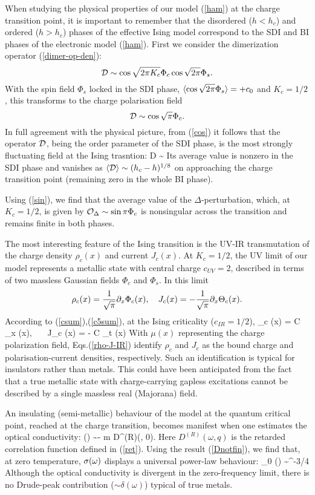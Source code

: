 When studying the physical properties of our model (\ref{ham}) at the charge
transition point, it is important to remember that the disordered ($h < h_c$)
and ordered ($h > h_c$) phases of the effective Ising model
correspond to the SDI and BI phases of the electronic model (\ref{ham}).
First we consider the dimerization operator (\ref{dimer-op-den}):
$$
{\cal D} \sim \cos \sqrt{2\pi K_c} \Phi_c \cos \sqrt{2\pi} \Phi_s.
$$
With the spin field $\Phi_s$ locked in the SDI phase,
$\langle \cos \sqrt{2\pi} \Phi_s \rangle = +c_0$ and $K_c =1/2$, this transforms to
the charge polarisation field
$$
{\cal D} \sim \cos \sqrt{\pi} \Phi_c.
$$
In full agreement with the physical picture, from (\ref{cos}) it follows that
the operator ${\cal D}$, being the 
order parameter of the SDI phase, is the most strongly fluctuating field
at the Ising trasntion:
\be
{\cal D} \sim \mu \label{D-mu}
\ee
Its average value is nonzero in the SDI phase and vanishes
as $\langle {\cal D} \rangle \sim (h_c - h)^{1/8}$ on approaching the charge transition
point (remaining zero in the whole BI phase).

Using (\ref{sin}), we find that
the average value of the $\Delta$-perturbation, which, at $K_c = 1/2$, is
given by
$
{\cal O}_{\Delta} \sim \sin {\pi} \Phi_c 
$
is nonsingular across the transition and remains finite in both
phases.

The most interesting feature of the Ising transition 
is the UV-IR transmutation of the charge density $\rho_c (x)$
and current $J_c (x)$. At $K_c = 1/2$, the UV limit of our model 
represents a metallic state with central charge $c_{UV} = 2$,
described in terms of two massless Gaussian fields $\Phi_c$ and $\Phi_s$.
In this limit
$$
\rho_c (x) = \frac{1}{\sqrt{\pi}} \partial_x \Phi_c (x), ~~~
J_c (x) = - \frac{1}{\sqrt{\pi}} \partial_x \Theta_c (x).
$$
According to (\ref{csum}),(\ref{c5sum}), at the Ising criticality
($c_{IR} = 1/2$),
\be
\rho_c (x) = C \p_x \mu (x), ~~~J_c (x) = - C \p_t \mu (x) 
\label{rho-J-IR}
\ee
With $\mu (x)$ representing the charge polarization field,
Eqs.(\ref{rho-J-IR}) identify $\rho_c$ and $J_c$ as the bound charge
and polarisation-current densities, 
respectively. Such an identification is typical
for insulators rather than metals. 
This could have been anticipated from the fact that a true metallic state
with charge-carrying gapless excitations cannot be described by a single
massless real (Majorana) field.

An insulating (semi-metallic) behaviour of the model at the 
quantum critical point, reached at the
charge transition,
becomes manifest when one estimates the optical conductivity:
\be
\s (\omega) \sim - \omega \Im m D^{(R)}(\omega, 0).
\label{optcond-def}
\ee
Here $D^{(R)}(\omega, q)$ is the retarded correlation function 
defined in (\ref{ret}). Using the result (\ref{Dnotfin}), we find that,
at zero temperature, $\sigma(\omega)$ displays a universal power-law
behaviour:
\be
\s_0 (\omega) \sim \omega^{-3/4} \label{optcond-T=0}
\ee
Although the optical conductivity is divergent in the zero-frequency limit,
there is no Drude-peak contribution ($\sim \delta(\omega)$) typical
of true metals.

